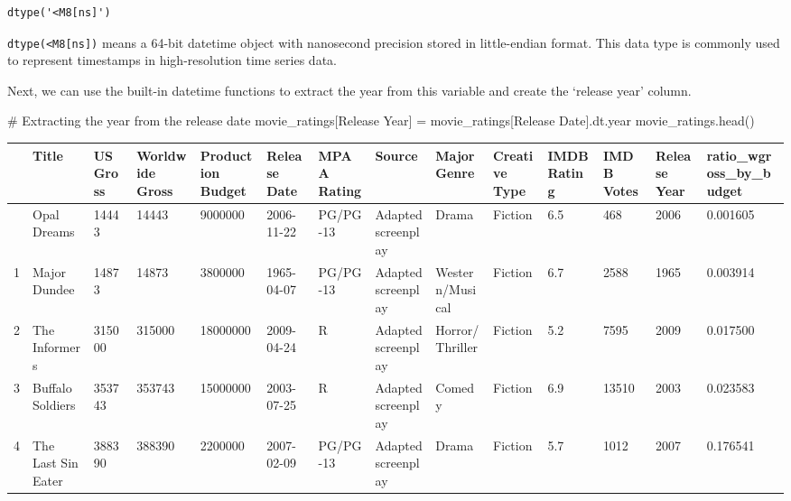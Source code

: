 \documentclass[
  letterpaper,
  DIV=11,
  numbers=noendperiod]{scrreprt}
\newenvironment{Shaded}{\begin{snugshade}}{\end{snugshade}}
\newcommand{\CommentTok}[1]{\textcolor[rgb]{0.37,0.37,0.37}{#1}}
\newcommand{\NormalTok}[1]{\textcolor[rgb]{0.00,0.23,0.31}{#1}}
\newcommand{\OperatorTok}[1]{\textcolor[rgb]{0.37,0.37,0.37}{#1}}
\newcommand{\StringTok}[1]{\textcolor[rgb]{0.13,0.47,0.30}{#1}}
\begin{document}
\begin{verbatim}
dtype('<M8[ns]')
\end{verbatim}

\texttt{dtype(\textquotesingle{}\textless{}M8{[}ns{]}\textquotesingle{})}
means a 64-bit datetime object with nanosecond precision stored in
little-endian format. This data type is commonly used to represent
timestamps in high-resolution time series data.

Next, we can use the built-in datetime functions to extract the year
from this variable and create the `release year' column.

\begin{Shaded}
\begin{Highlighting}[]
\CommentTok{\# Extracting the year from the release date}
\NormalTok{movie\_ratings[}\StringTok{\textquotesingle{}Release Year\textquotesingle{}}\NormalTok{] }\OperatorTok{=}\NormalTok{ movie\_ratings[}\StringTok{\textquotesingle{}Release Date\textquotesingle{}}\NormalTok{].dt.year}
\NormalTok{movie\_ratings.head()}
\end{Highlighting}
\end{Shaded}

\begin{longtable}[]{@{}llllllllllllll@{}}
\toprule\noalign{}
& Title & US Gross & Worldwide Gross & Production Budget & Release Date
& MPAA Rating & Source & Major Genre & Creative Type & IMDB Rating &
IMDB Votes & Release Year & ratio\_wgross\_by\_budget \\
\midrule\noalign{}
\endhead
\bottomrule\noalign{}
\endlastfoot
0 & Opal Dreams & 14443 & 14443 & 9000000 & 2006-11-22 & PG/PG-13 &
Adapted screenplay & Drama & Fiction & 6.5 & 468 & 2006 & 0.001605 \\
1 & Major Dundee & 14873 & 14873 & 3800000 & 1965-04-07 & PG/PG-13 &
Adapted screenplay & Western/Musical & Fiction & 6.7 & 2588 & 1965 &
0.003914 \\
2 & The Informers & 315000 & 315000 & 18000000 & 2009-04-24 & R &
Adapted screenplay & Horror/Thriller & Fiction & 5.2 & 7595 & 2009 &
0.017500 \\
3 & Buffalo Soldiers & 353743 & 353743 & 15000000 & 2003-07-25 & R &
Adapted screenplay & Comedy & Fiction & 6.9 & 13510 & 2003 & 0.023583 \\
4 & The Last Sin Eater & 388390 & 388390 & 2200000 & 2007-02-09 &
PG/PG-13 & Adapted screenplay & Drama & Fiction & 5.7 & 1012 & 2007 &
0.176541 \\
\end{longtable}
\end{document}
